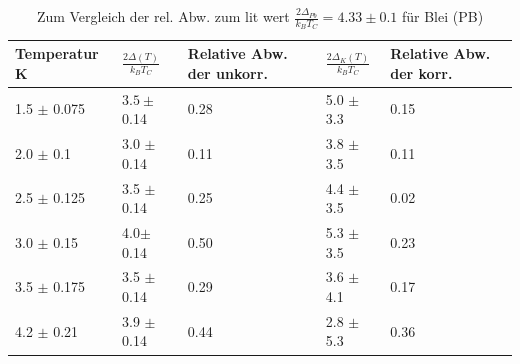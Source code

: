 \documentclass[twoside,        %
               BCOR12mm,       %
               english,ngerman, %
               fleqn,headsepline=false,footsepline=false
              ]{MFPREPORT}
\begin{document}
\begin{table}[]
\centering
\caption{Zum Vergleich der rel. Abw. zum lit wert $\frac{2 \Delta_{Pb}}{k_{B} T_{C}} = 4.33 \pm 0.1$ für Blei (PB)}
\label{my-label}
\begin{tabular}{|l|l|l|l|l|}
\hline
Temperatur K    & $\frac{2\Delta (T)}{k_{B} T_{C}}$ & Relative Abw. der unkorr. & $\frac{2\Delta_{K} (T)}{k_{B} T_{C}}$ & Relative Abw. der korr. \\ \hline
1.5 $\pm$ 0.075 & $3.5 \pm$ 0.14                    & 0.28                      & 5.0 $\pm$ 3.3                         & 0.15                    \\ \hline
2.0 $\pm$ 0.1   & 3.0 $\pm$ 0.14                    & 0.11                      & 3.8 $\pm$ 3.5                         & 0.11                    \\ \hline
2.5 $\pm$ 0.125 & 3.5 $\pm$ 0.14                    & 0.25                      & 4.4 $\pm$ 3.5                         & 0.02                    \\ \hline
3.0 $\pm$ 0.15  & 4.0$\pm$ 0.14                     & 0.50                      & 5.3 $\pm$ 3.5                         & 0.23                    \\ \hline
3.5 $\pm$ 0.175 & 3.5 $\pm$ 0.14                    & 0.29                      & 3.6 $\pm$ 4.1                         & 0.17                    \\ \hline
4.2 $\pm$ 0.21  & 3.9 $\pm$ 0.14                    & 0.44                      & 2.8 $\pm$ 5.3                         & 0.36                    \\ \hline
\end{tabular}
\label{tab:literatur}
\end{table}
\end{document}
